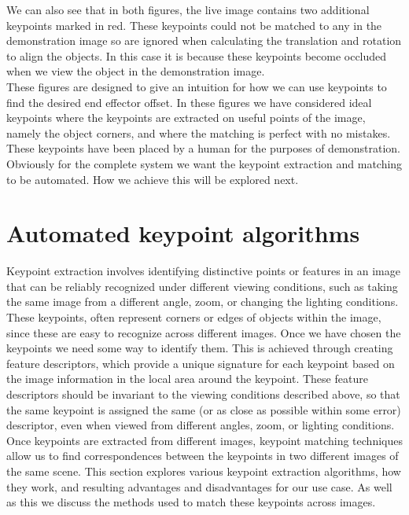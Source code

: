 We can also see that in both figures, the live image contains two additional keypoints marked in red. These keypoints could not be matched to any in the demonstration image so are ignored when calculating the translation and rotation to align the objects. In this case it is because these keypoints become occluded when we view the object in the demonstration image.\\

These figures are designed to give an intuition for how we can use keypoints to find the desired end effector offset. In these figures we have considered ideal keypoints where the keypoints are extracted on useful points of the image, namely the object corners, and where the matching is perfect with no mistakes. These keypoints have been placed by a human for the purposes of demonstration. Obviously for the complete system we want the keypoint extraction and matching to be automated. How we achieve this will be explored next.


\section{Automated keypoint algorithms}
\label{sec:keypoint-algos}
Keypoint extraction involves identifying distinctive points or features in an image that can be reliably recognized under different viewing conditions, such as taking the same image from a different angle, zoom, or changing the lighting conditions. These keypoints, often represent corners or edges of objects within the image, since these are easy to recognize across different images.
Once we have chosen the keypoints we need some way to identify them. This is achieved through creating feature descriptors, which provide a unique signature for each keypoint based on the image information in the local area around the keypoint. These feature descriptors should be invariant to the viewing conditions described above, so that the same keypoint is assigned the same (or as close as possible within some error) descriptor, even when viewed from different angles, zoom, or lighting conditions.
Once keypoints are extracted from different images, keypoint matching techniques allow us to find correspondences between the keypoints in two different images of the same scene. This section explores various keypoint extraction algorithms, how they work, and resulting advantages and disadvantages for our use case. As well as this we discuss the methods used to match these keypoints across images.

